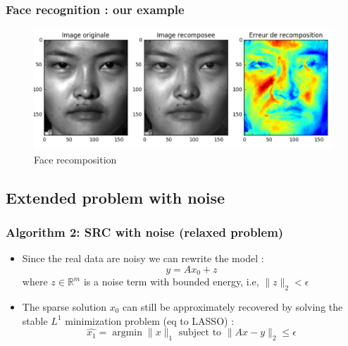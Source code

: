 \documentclass{beamer}
\DeclareMathOperator{\argmin}{argmin} %
\begin{document}

\begin{frame}
\frametitle{Face recognition : our example}

			\begin{figure}[!ht]
			\begin{center}
			\includegraphics[scale=0.4]{recomposition.png}
			\end{center}
			\caption{Face recomposition}
			\label{fa}
			\end{figure}
\end{frame}



\subsection{Extended problem with noise}


\begin{frame}

		\frametitle{Algorithm 2: SRC with noise (relaxed problem)}		

\begin{itemize}			
\item Since the real data are noisy we can rewrite the model : 
$$ y=Ax_{0}+z$$
where $z \in  \mathbb{R}^{m}$ is a noise term with bounded energy, i.e, $\|z\|_{2}< \epsilon$
\item The sparse solution $x_{0}$ can still be approximately recovered by solving the stable $L^{1}$ minimization problem (eq to LASSO) :
$$ \hat{x_{1}}= \argmin \|x\|_{1}  \mbox{ subject to } \|Ax-y\|_{2} \leq \epsilon $$
\end{itemize}
\end{frame}

\end{document}
